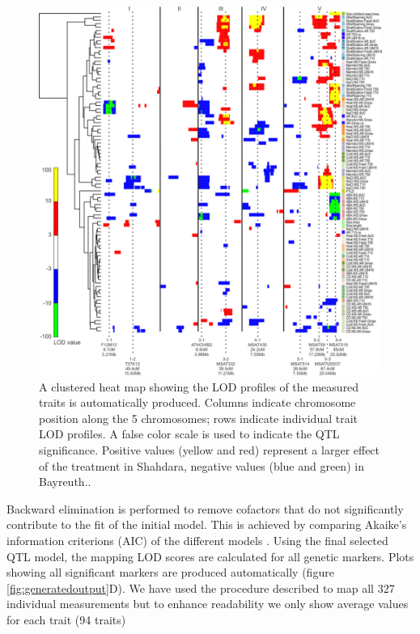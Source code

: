 \begin{figure}[h!]
  \centering
  \includegraphics[keepaspectratio,scale=0.30]{eps/image_3_1_4.eps}
  \caption[QTL locations.]{A clustered heat map showing the LOD profiles of the measured traits is automatically 
          produced. Columns indicate chromosome position along the 5 chromosomes; rows indicate individual trait 
          LOD profiles. A false color scale is used to indicate the QTL significance. Positive values (yellow and red) 
          represent a larger effect of the treatment in Shahdara, negative values (blue and green) in Bayreuth..}
\end{figure}

Backward elimination is performed to remove cofactors that do not significantly contribute to the fit 
of the initial model. This is achieved by comparing Akaike's information criterions (AIC) of the 
different models \cite{Jansen:1993}. Using the final selected QTL model, the mapping LOD scores are 
calculated for all genetic markers. Plots showing all significant markers are produced automatically 
(figure \ref{fig:generatedoutput}D). We have used the procedure described to map all 327 individual measurements but to enhance
readability we only show average values for each trait (94 traits)

